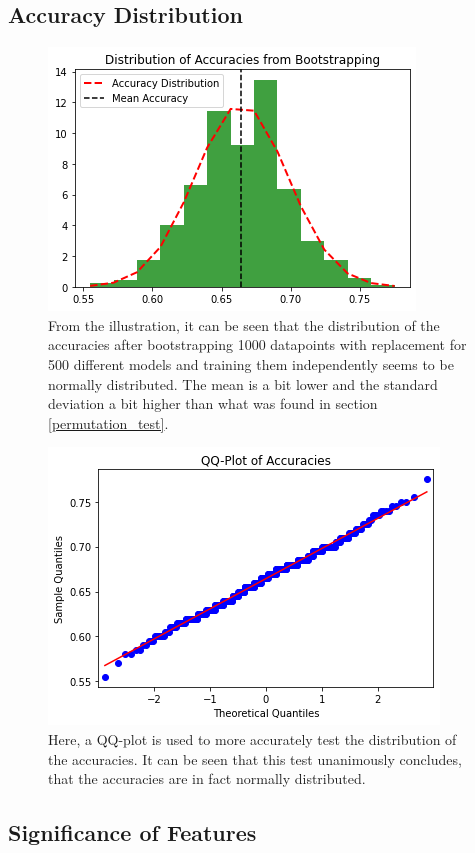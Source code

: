 \documentclass[11pt, fleqn, titlepage]{article}
\begin{document}
	\subsection{Accuracy Distribution}
	\begin{figure}[H]
		\centering
		\includegraphics[width=0.5\linewidth]{imgs/accuracy_distribution}
		\caption{From the illustration, it can be seen that the distribution of the accuracies after bootstrapping 1000 datapoints with replacement for 500 different models and training them independently seems to be normally distributed. The mean is a bit lower and the standard deviation a bit higher than what was found in section \ref{permutation_test}.}
		\label{fig:accuracydistribution}
	\end{figure}
	
	\begin{figure}[H]
		\centering
		\includegraphics[width=0.5\linewidth]{imgs/qqplot_accuracies}
		\caption{Here, a QQ-plot is used to more accurately test the  distribution of the accuracies. It can be seen that this test unanimously concludes, that the accuracies are in fact normally distributed.}
		\label{fig:qqplotaccuracies}
	\end{figure}
	\newpage
	
	\subsection{Significance of Features}
	
\end{document}
